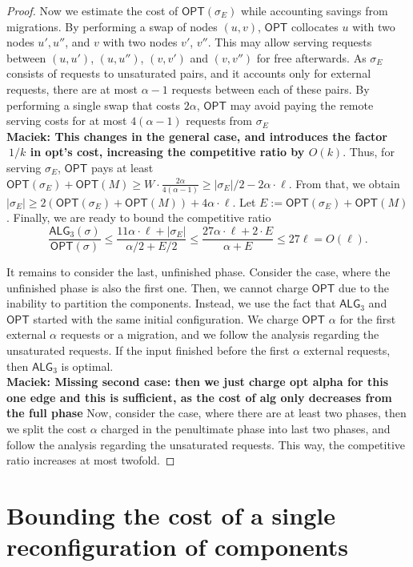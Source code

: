 \documentclass[manuscript,screen=true, review, anonymous]{acmart}
\newcommand{\OPT}{\textsf{OPT}\xspace}
\newcommand{\TAlg}{{\ensuremath{\textsf{ALG}_{3}}}\xspace}
\newcommand\maciek[1]{\color{brown}\textbf{\\ Maciek: #1}\color{black}}
\begin{document}
\begin{proof}
  Now we estimate the cost of $\OPT(\sigma_E)$ while accounting savings from migrations.
  By performing a swap of nodes $(u,v)$, $\OPT$ collocates $u$ with two nodes $u', u''$, and $v$ with two nodes $v'$, $v''$.
  This may allow serving requests between $(u,u')$, $(u,u'')$, $(v,v')$ and $(v,v'')$ for free afterwards.
  As $\sigma_E$ consists of requests to unsaturated pairs, and it accounts only for external requests, there are at most $\alpha-1$ requests between each of these pairs.
  By performing a single swap that costs $2\alpha$, $\OPT$ may avoid paying the remote serving costs for at most $4 (\alpha - 1)$ requests from $\sigma_E$
  \maciek{This changes in the general case, and introduces the factor $~1/k$ in opt's cost, increasing the competitive ratio by $O(k)$}.
  Thus, for serving $\sigma_E$, $\OPT$ pays at least $\OPT(\sigma_E) + \OPT(M) \geq W \cdot \frac{2\alpha}{4 (\alpha-1)}\geq |\sigma_E| / 2 - 2 \alpha \cdot \ell$.
  From that, we obtain $|\sigma_E| \geq 2(\OPT(\sigma_E)+\OPT(M)) + 4\alpha \cdot \ell$.
  Let $E := \OPT(\sigma_E) + \OPT(M)$. Finally, we are ready to bound the competitive ratio
  \begin{equation*}
    \frac{\TAlg(\sigma)}{\OPT(\sigma)} \leq \frac{11\alpha \cdot \ell + |\sigma_E|}{\alpha/2 + E/2} \leq \frac{27\alpha\cdot\ell + 2\cdot E}{\alpha + E} \leq 27 \ell = O(\ell).
  \end{equation*}

  \medskip

  It remains to consider the last, unfinished phase.
  Consider the case, where the unfinished phase is also the first one.
  Then, we cannot charge $\OPT$ due to the inability to partition the components.
  Instead, we use the fact that \TAlg and $\OPT$ started with the same initial configuration.
  We charge $\OPT$ $\alpha$ for the first external $\alpha$ requests or a migration,
  and we follow the analysis regarding the unsaturated requests.
  If the input finished before the first $\alpha$ external requests, then \TAlg is optimal.
  \maciek{Missing second case: then we just charge opt alpha for this one edge and this is sufficient, as the cost of alg only decreases from the full phase}
  Now, consider the case, where there are at least two phases, then we split the cost $\alpha$ charged in the penultimate phase into last two phases, and follow the analysis regarding the unsaturated requests.
  This way, the competitive ratio increases at most twofold.
\end{proof}


\section{Bounding the cost of a single reconfiguration of components}
\end{document}
